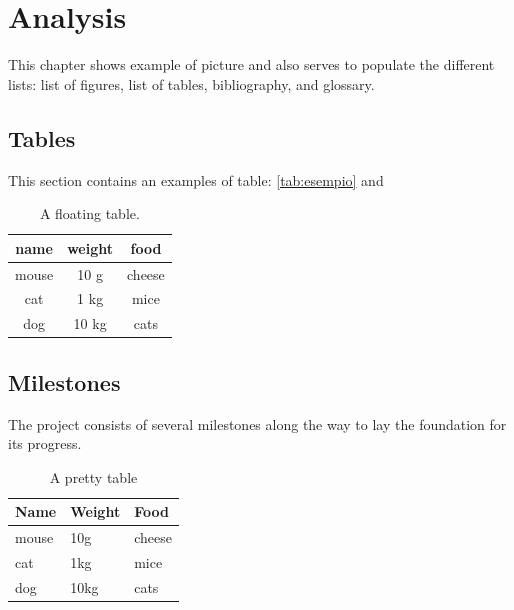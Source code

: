 \chapter{Analysis}
\label{chap:analysis}

This chapter shows example of picture and also serves to populate the different lists: list of figures, list of tables,
bibliography, and glossary.

\section{Tables}

This section contains an examples of table: \autoref{tab:esempio} and 

\begin{table}[H]
    \centering
    \begin{tabular}{ccc}
        \toprule
        name  & weight & food   \\ 
        \midrule
        mouse & 10 g   & cheese \\
        cat   & 1 kg   & mice   \\
        dog   & 10 kg  & cats   \\
        \bottomrule
    \end{tabular}
    \caption[A floating table]{A floating table.}
    \label{tab:esempio}
\end{table}

\section{Milestones}
\label{sec:milestones}

The project consists of several milestones along the way to lay the foundation for its progress.

\begin{table}[H]
    \centering
    \begin{tabular}{|L{2.5cm}|L{2.5cm}|C{3cm}|}
        \hline
         \textbf{\large{Name}} & \textbf{\large{Weight}} & \textbf{\large{Food}} \\
        \hline
        mouse                                                    & 10g                     & cheese                \\
        \hline
        cat                                                      & 1kg                     & mice                  \\
        \hline
        dog                                                      & 10kg                    & cats                  \\
        \hline
    \end{tabular}
    \caption{A pretty table}
\end{table}

